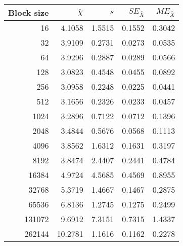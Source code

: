 \begin{tabular}{rrrrr}\toprule
{\small Block size} & $\bar{X}$ & $s$ & $SE_{\bar{X}}$ & $ME_{\bar{X}}$ \\\midrule
16 & 4.1058 & 1.5515 & 0.1552 & 0.3042\\
32 & 3.9109 & 0.2731 & 0.0273 & 0.0535\\
64 & 3.9296 & 0.2887 & 0.0289 & 0.0566\\
128 & 3.0823 & 0.4548 & 0.0455 & 0.0892\\
256 & 3.0958 & 0.2248 & 0.0225 & 0.0441\\
512 & 3.1656 & 0.2326 & 0.0233 & 0.0457\\
1024 & 3.2896 & 0.7122 & 0.0712 & 0.1396\\
2048 & 3.4844 & 0.5676 & 0.0568 & 0.1113\\
4096 & 3.8562 & 1.6312 & 0.1631 & 0.3197\\
8192 & 3.8474 & 2.4407 & 0.2441 & 0.4784\\
16384 & 4.9724 & 4.5685 & 0.4569 & 0.8955\\
32768 & 5.3719 & 1.4667 & 0.1467 & 0.2875\\
65536 & 6.8136 & 1.2745 & 0.1275 & 0.2499\\
131072 & 9.6912 & 7.3151 & 0.7315 & 1.4337\\
262144 & 10.2781 & 1.1616 & 0.1162 & 0.2278\\
\bottomrule
\end{tabular}
